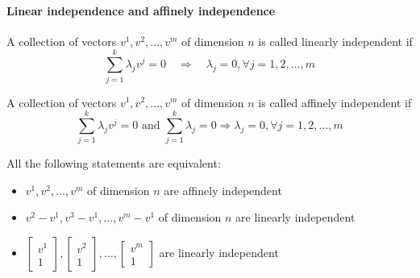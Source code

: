             \paragraph{Linear independence and affinely independence}
                A collection of vectors $v^1, v^2, \dots, v^m$ of dimension $n$ is called linearly independent if
                \begin{equation*} 
                    \sum_{j=1}^k \lambda_j v^j = 0 \quad \Rightarrow \quad \lambda_j = 0, \forall j =1,2, \dots, m
                \end{equation*}
            
                A collection of vectors $v^1, v^2, \dots, v^m$ of dimension $n$ is called affinely independent if
                \begin{equation*} 
                    \sum_{j=1}^k \lambda_j v^j = 0 \text{ and } \sum_{j=1}^k \lambda_j = 0 \Rightarrow \lambda_j = 0, \forall j =1,2, \dots, m 
                \end{equation*} 

                All the following statements are equivalent:
                \begin{itemize}
                    \item $v^1, v^2, \dots, v^m$ of dimension $n$ are affinely independent
                    \item $v^2 - v^1, v^3-v^1, \dots, v^m-v^1$ of dimension $n$ are linearly independent
                    \item $\left [ \begin{matrix}v^1 \\ 1\end{matrix} \right ], \left [ \begin{matrix}v^2 \\ 1\end{matrix} \right ], \dots, \left [ \begin{matrix}v^m \\ 1\end{matrix} \right ]$ are linearly independent
                \end{itemize}

